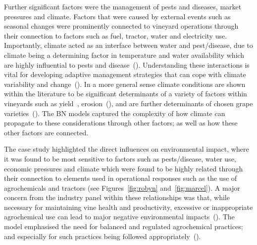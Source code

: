 \documentclass[fleqn,10pt]{wlscirep}
\begin{document}
Further significant factors were the management of pests and diseases, market pressures and climate. Factors that were caused by external events such as seasonal changes were prominently connected to vineyard operations through their connection to factors such as fuel, tractor, water and electricity use. Importantly, climate acted as an interface between water and pest/disease, due to climate being a determining factor in temperature and water availability which are highly influential to pests and disease~(\cite{boisClimateVsGrapevine2017}). Understanding these interactions is vital for developing adaptive management strategies that can cope with climate variability and change~(\cite{agostaRegionalClimateVariability2012,alsafadiFutureScenariosBioclimatic2023,barriguinhaVineyardYieldEstimation2021,sharmaChapterImpactClimate2014}). In a more general sense climate conditions are shown within the literature to be significant determinants of a variety of factors within vineyards such as yield~\cite{barriguinhaVineyardYieldEstimation2021,antonComparativeStudyRisk2012}, erosion~(\cite{biddoccuEvaluationSoilErosion2020,doi:10.1177/0309133319861833}), and are further determinants of chosen grape varieties~(\cite{topferGrapeVarietiesAre2022, petriashviliImpactClimateChange2023}). The BN models captured the complexity of how climate can propagate to these considerations through other factors; as well as how these other factors are connected.

The case study highlighted the direct influences on environmental impact, where it was found to be most sensitive to factors such as pests/disease, water use, economic pressures and climate which were found to be highly related through their connection to elements used in operational responses such as the use of agrochemicals and tractors (see Figures~\ref{fig:robyn} and~\ref{fig:marcel}). A major concern from the industry panel within these relationships was that, while necessary for maintaining vine health and productivity, excessive or inappropriate agrochemical use can lead to major negative environmental impacts~(\cite{alonsogonzalezUnveilingTerroirEvaluating2024,manjarres-lopezAssessmentPesticideResidues2021}). The model emphasised the need for balanced and regulated agrochemical practices; and especially for such practices being followed appropriately~(\cite{baianoOverviewSustainabilityWine2021}).

\end{document}
